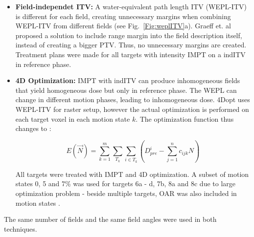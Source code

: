 \begin{itemize}
\item \textbf{Field-independet ITV:} A water-equivalent path length ITV (WEPL-ITV) is different for each field, creating unnecessary margins when combining WEPL-ITV from different fields (see Fig.~\ref{Fig:weplITV}a). 
Graeff et. al \cite{Graeff2012} proposed a solution to include range margin into the field description itself, instead of creating a bigger PTV. 
Thus, no unnecessary margins are created. Treatment plans were made for all targets with intensity IMPT on a indITV in reference phase.

\item \textbf{4D Optimization:} IMPT with indITV can produce inhomogeneous fields that yield homogeneous dose but only in reference phase. The WEPL can change in different motion phases, leading to inhomogeneous dose.
4Dopt uses WEPL-ITV for raster setup, however the actual optimization is performed on each target voxel in each motion state $k$. The optimization function thus changes to \cite{Graeff2012}:

\begin{equation}
\label{eq-multiCost}
E(\vec{N}) = \sum_{k=1}^{m}\sum_{T_k} \sum_{i\in T_k} \left( D_{pre}^{i} -\sum_{j=1}^n c_{ijk}N\right)
\end{equation}

All targets were treated with IMPT and 4D optimization. A subset of motion states 0, 5 and 7\% was used for targets 6a - d, 7b, 8a and 8c due to large optimization problem - beside multiple targets, 
OAR was also included in motion states \cite{Graeff2012}.

\end{itemize}


The same number of fields and the same field angles were used in both techniques.

